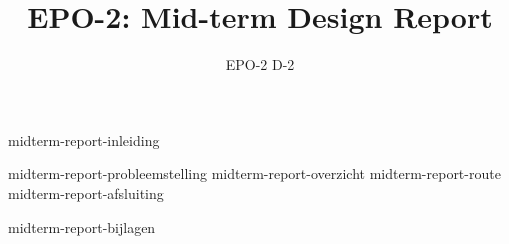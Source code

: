 \documentclass{report}
\title{EPO-2: Mid-term Design Report}
\author{EPO-2 D-2}
\begin{document}
\maketitle
\newpage
{}

{midterm-report-inleiding}
\tableofcontents

\newpage
{}

{midterm-report-probleemstelling}
{midterm-report-overzicht}
{midterm-report-route}
{midterm-report-afsluiting}

\newpage
{}

\printbibliography
{midterm-report-bijlagen}
\end{document}

